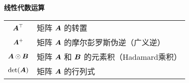 \vspace{\notationgap}
\begin{minipage}{\textwidth}
\centerline{\bf 线性代数运算}
\bgroup
\def\arraystretch{1.5}
\begin{tabular}{cp{3.25in}}
$\displaystyle {\bm{A}}^\top$ & 矩阵 ${\bm{A}}$ 的转置 \\
$\displaystyle {\bm{A}}^+$ & 矩阵 ${\bm{A}}$ 的摩尔彭罗斯伪逆（广义逆）\\
$\displaystyle {\bm{A}} \odot {\bm{B}} $ & 矩阵 ${\bm{A}}$ 和 ${\bm{B}}$ 的元素积（Hadamard乘积）\\
$\displaystyle \mathrm{det}({\bm{A}})$ & 矩阵 ${\bm{A}}$ 的行列式\\
\end{tabular}
\egroup
{}
\end{minipage}


